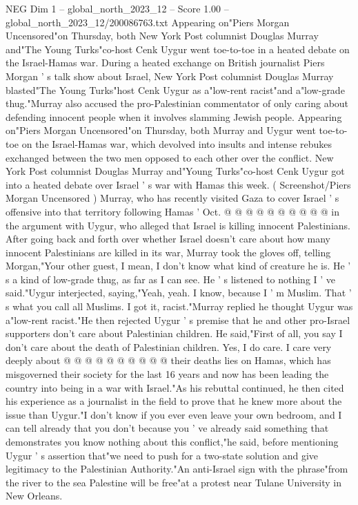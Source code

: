 \begin{textsample}{NEG Dim 1 – global\_north\_2023\_12 – Score 1.00 – global\_north\_2023\_12/200086763.txt}  \label{ex:f1_neg_205}
Appearing on"Piers Morgan Uncensored"on Thursday, both New York Post columnist Douglas Murray and"The Young Turks"co-host Cenk Uygur went toe-to-toe in a heated debate on the Israel-Hamas war.
During a heated exchange on British journalist Piers Morgan ' s talk show about Israel, New York Post columnist Douglas Murray blasted"The Young Turks"host Cenk Uygur as a"low-rent racist"and a"low-grade thug."Murray also accused the pro-Palestinian commentator of only caring about defending innocent people when it involves slamming Jewish people.
Appearing on"Piers Morgan Uncensored"on Thursday, both Murray and Uygur went toe-to-toe on the Israel-Hamas war, which devolved into insults and intense rebukes exchanged between the two men opposed to each other over the conflict.
New York Post columnist Douglas Murray and"Young Turks"co-host Cenk Uygur got into a heated debate over Israel ' s war with Hamas this week. ( Screenshot/Piers Morgan Uncensored ) Murray, who has recently visited Gaza to cover Israel ' s offensive into that territory following Hamas ' Oct. @ @ @ @ @ @ @ @ @ @ in the argument with Uygur, who alleged that Israel is killing innocent Palestinians.
After going back and forth over whether Israel doesn't care about how many innocent Palestinians are killed in its war, Murray took the gloves off, telling Morgan,"Your other guest, I mean, I don't know what kind of creature he is.
He ' s a kind of low-grade thug, as far as I can see.
He ' s listened to nothing I ' ve said."Uygur interjected, saying,"Yeah, yeah.
I know, because I ' m Muslim.
That ' s what you call all Muslims.
I got it, racist."Murray replied he thought Uygur was a"low-rent racist."He then rejected Uygur ' s premise that he and other pro-Israel supporters don't care about Palestinian children.
He said,"First of all, you say I don't care about the death of Palestinian children.
Yes, I do care.
I care very deeply about @ @ @ @ @ @ @ @ @ @ their deaths lies on Hamas, which has misgoverned their society for the last 16 years and now has been leading the country into being in a war with Israel."As his rebuttal continued, he then cited his experience as a journalist in the field to prove that he knew more about the issue than Uygur."I don't know if you ever even leave your own bedroom, and I can tell already that you don't because you ' ve already said something that demonstrates you know nothing about this conflict,"he said, before mentioning Uygur ' s assertion that"we need to push for a two-state solution and give legitimacy to the Palestinian Authority."An anti-Israel sign with the phrase"from the river to the sea Palestine will be free"at a protest near Tulane University in New Orleans.

\end{textsample}
